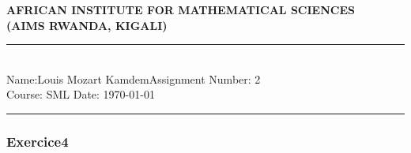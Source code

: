 \documentclass[12pt,a4paper]{article}
\newcommand{\student}{Louis Mozart Kamdem}
\begin{document}
	
	\thispagestyle{empty}
	\begin{center}
		\textbf{AFRICAN INSTITUTE FOR MATHEMATICAL SCIENCES \\[0.5cm]
			(AIMS RWANDA, KIGALI)}
		\vspace{1.0cm}
	\end{center}
	
	\noindent
	\rule{17cm}{0.2cm}\\[0.3cm]
	Name:\student \hfill Assignment Number: 2\\[0.1cm]
	Course: SML \hfill Date: \today\\
	\rule{17cm}{0.05cm}
	\vspace{1.0cm} 
	\subsubsection*{Exercice4}
	
\end{document}
